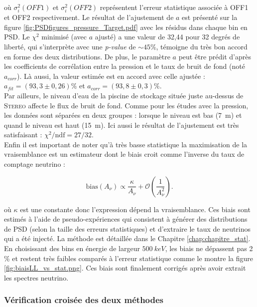 où $\sigma^2_i(OFF1)$ et $\sigma^2_i(OFF2)$ représentent l'erreur statistique associée à OFF1 et OFF2 respectivement. Le résultat de l'ajustement de $a$ est présenté sur la figure \ref{fig:PSDfigures_pressure_Target.pdf} avec les résidus dans chaque bin en PSD. Le $\chi^2$ minimisé (avec $a$ ajusté) a une valeur de 32,44 pour 32 degrés de liberté, qui s'interprète avec une \textit{p-value} de $\sim 45\%$, témoigne du très bon accord en forme des deux distributions. De plus, le paramètre $a$ peut être prédit d'après les coefficients de corrélation entre la pression et le taux de bruit de fond (noté $a_{corr}$). Là aussi, la valeur estimée est en accord avec celle ajustée : $a_{fit} = (93,3 \pm 0,26) \%$ et $a_{corr} = (93,8 \pm 0,3) \%$.\\

Par ailleurs, le niveau d'eau de la piscine de stockage située juste au-dessus de \textsc{Stereo} affecte le flux de bruit de fond. Comme pour les études avec la pression, les données sont séparées en deux groupes : lorsque le niveau est bas (\SI{7}{m}) et quand le niveau est haut (\SI{15}{m}). Ici aussi le résultat de l'ajustement est très satisfaisant : $\chi^2/\textrm{ndf} = 27/32$.\\

Enfin il est important de noter qu'à très basse statistique la maximisation de la vraisemblance est un estimateur dont le biais croit comme l'inverse du taux de comptage neutrino \cite{CIS-6239} :

\begin{equation}
    \textrm{bias}(A_\nu) \propto \frac{\kappa}{A_\nu} + \mathcal{O}\left(\frac{1}{A_\nu^2} \right).
\end{equation}

où $\kappa$ est une constante donc l'expression dépend la vraisemblance. Ces biais sont estimés à l'aide de \og pseudo-expériences \fg{} qui consistent à générer des distributions de PSD (selon la taille des erreurs statistiques) et d'extraire le taux de neutrinos qui a été injecté. La méthode est détaillée dans le Chapitre \ref{chap:chapitre_stat}.  En choisissant des bins en énergie de largeur $\SI{500}{keV}$, les biais ne dépassent pas 2 \% et restent très faibles comparés à l'erreur statistique comme le montre la figure \ref{fig:biaisLL_vs_stat.png}. Ces biais sont finalement corrigés après avoir extrait les spectres neutrino.

\bigbreak

\subsubsection*{Vérification croisée des deux méthodes}

